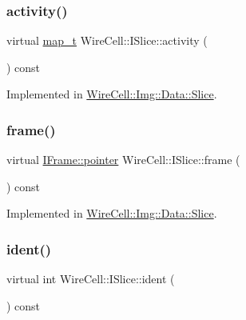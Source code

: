 \subsubsection{\texorpdfstring{activity()}{activity()}}
{\footnotesize\ttfamily virtual \hyperlink{class_wire_cell_1_1_i_slice_ac953094751a404827468ca9887736415}{map\+\_\+t} Wire\+Cell\+::\+I\+Slice\+::activity (\begin{DoxyParamCaption}{ }\end{DoxyParamCaption}) const\hspace{0.3cm}{\ttfamily [pure virtual]}}



Implemented in \hyperlink{class_wire_cell_1_1_img_1_1_data_1_1_slice_a7f321316b726582a7d476ecebbdc2dc5}{Wire\+Cell\+::\+Img\+::\+Data\+::\+Slice}.

\mbox{\label{class_wire_cell_1_1_i_slice_abc8484df4c8c4624b4a6e0819e5916e1}} 
\subsubsection{\texorpdfstring{frame()}{frame()}}
{\footnotesize\ttfamily virtual \hyperlink{class_wire_cell_1_1_i_data_aff870b3ae8333cf9265941eef62498bc}{I\+Frame\+::pointer} Wire\+Cell\+::\+I\+Slice\+::frame (\begin{DoxyParamCaption}{ }\end{DoxyParamCaption}) const\hspace{0.3cm}{\ttfamily [pure virtual]}}



Implemented in \hyperlink{class_wire_cell_1_1_img_1_1_data_1_1_slice_acff7cfb312929c31f3e457dfa96d37e6}{Wire\+Cell\+::\+Img\+::\+Data\+::\+Slice}.

\mbox{\label{class_wire_cell_1_1_i_slice_ab5c8c4d99b373a92cdd54ef5dafde4ec}} 
\subsubsection{\texorpdfstring{ident()}{ident()}}
{\footnotesize\ttfamily virtual int Wire\+Cell\+::\+I\+Slice\+::ident (\begin{DoxyParamCaption}{ }\end{DoxyParamCaption}) const\hspace{0.3cm}{\ttfamily [pure virtual]}}



